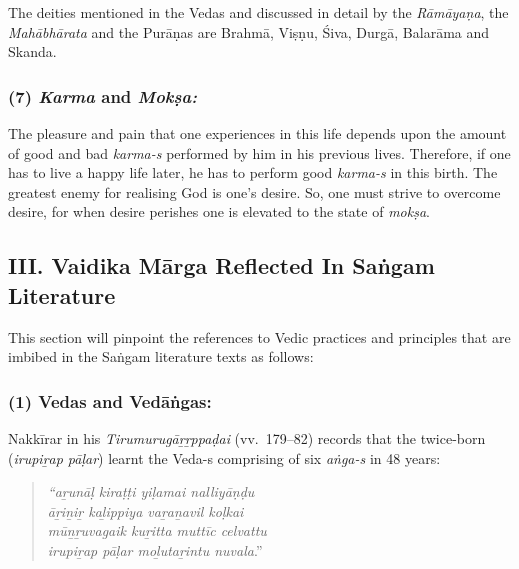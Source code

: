 \vskip -8pt

The deities mentioned in the Vedas and discussed in detail by the \textit{Rāmāyaṇa}, the \textit{Mahābhārata} and the Purāṇas are Brahmā, Viṣṇu, Śiva, Durgā, Balarāma and Skanda.


\subsubsection*{(7) \textit{Karma} and \textit{Mokṣa:}}

\vskip -8pt

The pleasure and pain that one experiences in this life depends upon the amount of good and bad \textit{karma-s} performed by him in his previous lives. Therefore, if one has to live a happy life later, he has to perform good \textit{karma-s} in this birth. The greatest enemy for realising God is one’s desire. So, one must strive to overcome desire, for when desire perishes one is elevated to the state of \textit{mokṣa}.


\subsection*{III. Vaidika Mārga Reflected In Saṅgam Literature}

\vskip -8pt

This section will pinpoint the references to Vedic practices and principles that are imbibed in the Saṅgam literature texts as follows:

\subsubsection*{(1) Vedas and Vedāṅgas:}

\vskip -12pt

Nakkīrar in his \textit{Tirumurugāṟṟppaḍai} (vv.~179–82) records that the twice-born (\textit{irupiṟap pāḷar}) learnt the Veda-s comprising of six \textit{aṅga-s} in 48 years:

\vskip -11pt

\begin{quote}
\textit{“aṟunāḷ kiraṭṭi yiḷamai nalliyāṇḍu}\\\textit{āṟiṉiṟ kaḻippiya vaṟaṉavil koḷkai}\\\textit{mūṉṟuvagaik kuṟitta muttīc celvattu}\\\textit{irupiṟap pāḷar moḻutaṟintu nuvala}.”
\end{quote}

\vskip -11pt

